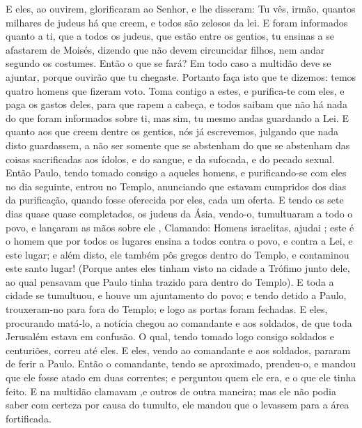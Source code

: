 {E eles, ao ouvirem, glorificaram ao Senhor, e lhe disseram: Tu vês, irmão, quantos milhares de judeus há que creem, e todos são zelosos da lei.
E foram informados quanto a ti, que a todos os judeus, que estão entre os gentios,
{} tu ensinas a se afastarem de Moisés, dizendo que não devem circuncidar
{} filhos, nem andar segundo os costumes.
Então o que se fará? Em todo caso a multidão deve se ajuntar, porque ouvirão que tu
{} chegaste.
Portanto faça isto que te dizemos: temos quatro homens que fizeram voto.
Toma contigo a estes, e purifica-te com eles, e paga os gastos deles, para que rapem a cabeça, e todos saibam que não há nada do que foram informados sobre ti, mas sim,
{} tu mesmo andas guardando a Lei.
E quanto aos que creem dentre os gentios, nós já escrevemos, julgando que nada disto guardassem, a não ser somente que se abstenham do que se abstenham das coisas sacrificadas aos ídolos, e do sangue, e da
{} sufocada, e do pecado sexual.
Então Paulo, tendo tomado consigo a aqueles homens, e purificando-se com eles no dia seguinte, entrou no Templo, anunciando que
{} estavam cumpridos dos dias da purificação, quando fosse oferecida por eles, cada um
{} oferta.
E tendo os sete dias quase quase completados, os judeus da Ásia, vendo-o, tumultuaram a todo o povo, e lançaram as mãos sobre ele
{} ,
Clamando: Homens israelitas, ajudai
{} ; este é o homem que por todos os lugares ensina a todos contra o
{} povo, e contra a Lei, e
{} este lugar; e além disto, ele também pôs gregos dentro do Templo, e contaminou este santo lugar!
(Porque antes eles tinham visto na cidade a Trófimo junto dele, ao qual pensavam que Paulo tinha trazido para dentro do Templo).
E toda a cidade se tumultuou, e houve um ajuntamento do povo; e tendo detido a Paulo, trouxeram-no para fora do Templo; e logo as portas foram fechadas.
E eles, procurando matá-lo, a notícia chegou ao comandante e aos soldados, de que toda Jerusalém estava em confusão.
O qual, tendo tomado logo consigo soldados e centuriões, correu até eles. E eles, vendo ao comandante e aos soldados, pararam de ferir a Paulo.
Então o comandante, tendo se aproximado, prendeu-o, e mandou que ele fosse atado em duas correntes; e perguntou quem ele era, e o que ele tinha feito.
E na multidão clamavam
{} ,e outros de outra maneira; mas
{} ele não podia saber com certeza por causa do tumulto, ele mandou que o levassem para a área fortificada.
}
